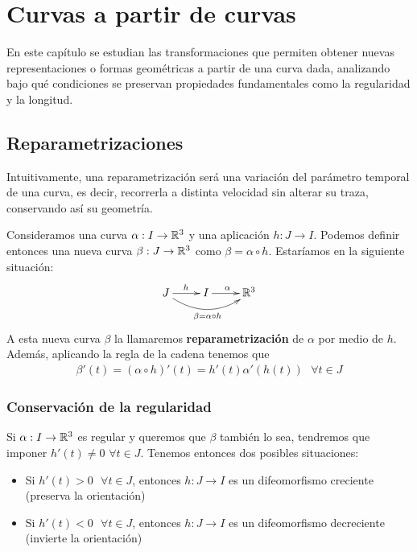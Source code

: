 \chapter{Curvas a partir de curvas}

En este capítulo se estudian las transformaciones que permiten obtener nuevas representaciones o formas geométricas a partir de una curva dada, analizando bajo qué condiciones se preservan propiedades fundamentales como la regularidad y la longitud.

\section{Reparametrizaciones}

Intuitivamente, una reparametrización será una variación del parámetro temporal de una curva, es decir, recorrerla a distinta velocidad sin alterar su traza, conservando así su geometría.

\begin{definicion}
    Consideramos una curva $\alpha:I \to \mathbb{R}^3$ y una aplicación $h:J\to I$. Podemos definir entonces una nueva curva $\beta:J \to \mathbb{R}^3$ como $\beta = \alpha\circ h$. Estaríamos en la siguiente situación:
    \begin{gather*}
        \xymatrix{
            J \ar[r]^h \ar@/_{5mm}/[rr]_{\beta=\alpha\circ h} & I \ar[r]^{\alpha} & \bb{R}^3
        }
    \end{gather*}
    A esta nueva curva $\beta$ la llamaremos \textbf{reparametrización} de $\alpha$ por medio de $h$. Además, aplicando la regla de la cadena tenemos que
    \begin{gather*}
        \beta'(t) = (\alpha \circ h)'(t) = h'(t)\alpha'(h(t))\ \ \ \forall t \in J
    \end{gather*}
\end{definicion}

\subsection{Conservación de la regularidad}

Si $\alpha:I\to \mathbb{R}^3$ es regular y queremos que $\beta$ también lo sea, tendremos que imponer $h'(t)\neq 0$ $\forall t \in J$. Tenemos entonces dos posibles situaciones:

\begin{itemize}
    \item Si $h'(t)>0\ \ \ \forall t \in J$, entonces $h:J\to I$ es un difeomorfismo creciente (preserva la orientación)
    \item Si $h'(t)<0\ \ \ \forall t \in J$, entonces $h:J\to I$ es un difeomorfismo decreciente (invierte la orientación)
\end{itemize}

